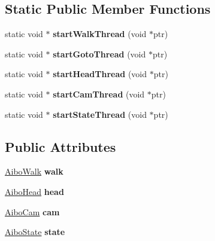 \subsection*{Static Public Member Functions}
\begin{DoxyCompactItemize}
\item 
\hypertarget{classAiboCore_a13a87fc18c956d451abee2c700bb8237}{
static void $\ast$ {\bfseries startWalkThread} (void $\ast$ptr)}
\label{classAiboCore_a13a87fc18c956d451abee2c700bb8237}

\item 
\hypertarget{classAiboCore_ab2e658d2435eb963380441bfa13f8e7e}{
static void $\ast$ {\bfseries startGotoThread} (void $\ast$ptr)}
\label{classAiboCore_ab2e658d2435eb963380441bfa13f8e7e}

\item 
\hypertarget{classAiboCore_a1de5d2c7560b3a92f50c00d1a0f9796a}{
static void $\ast$ {\bfseries startHeadThread} (void $\ast$ptr)}
\label{classAiboCore_a1de5d2c7560b3a92f50c00d1a0f9796a}

\item 
\hypertarget{classAiboCore_a2480ecb5c9af5c5e11c6062fbc7b013f}{
static void $\ast$ {\bfseries startCamThread} (void $\ast$ptr)}
\label{classAiboCore_a2480ecb5c9af5c5e11c6062fbc7b013f}

\item 
\hypertarget{classAiboCore_a7a115b2d17494c45a0db4827def0dc76}{
static void $\ast$ {\bfseries startStateThread} (void $\ast$ptr)}
\label{classAiboCore_a7a115b2d17494c45a0db4827def0dc76}

\end{DoxyCompactItemize}
\subsection*{Public Attributes}
\begin{DoxyCompactItemize}
\item 
\hypertarget{classAiboCore_a0bfbdcab738086d571c8dd9936408221}{
\hyperlink{classAiboWalk}{AiboWalk} {\bfseries walk}}
\label{classAiboCore_a0bfbdcab738086d571c8dd9936408221}

\item 
\hypertarget{classAiboCore_a82f60f050d49dc500a23beff1c80d658}{
\hyperlink{classAiboHead}{AiboHead} {\bfseries head}}
\label{classAiboCore_a82f60f050d49dc500a23beff1c80d658}

\item 
\hypertarget{classAiboCore_ac299b12604a05d4be74eafac7162ba10}{
\hyperlink{classAiboCam}{AiboCam} {\bfseries cam}}
\label{classAiboCore_ac299b12604a05d4be74eafac7162ba10}

\item 
\hypertarget{classAiboCore_a0fa33a5c79f9f53eebedde7e361a0753}{
\hyperlink{classAiboState}{AiboState} {\bfseries state}}
\label{classAiboCore_a0fa33a5c79f9f53eebedde7e361a0753}

\end{DoxyCompactItemize}



